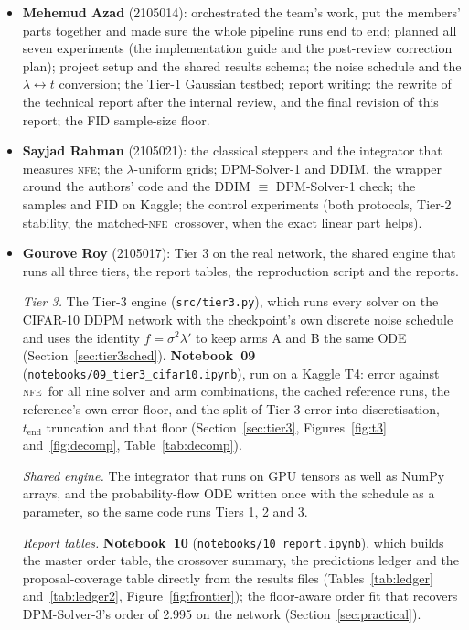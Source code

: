 \documentclass[sigconf]{acmart}
\newcommand{\NFE}{\textsc{nfe}}
\newcommand{\lam}{\lambda}
\newcommand{\tend}{t_{\text{end}}}
\begin{document}
\begin{itemize}
\item \textbf{Mehemud Azad} (2105014): orchestrated the team's work, put the
  members' parts together and made sure the whole pipeline runs end
  to end; planned all seven experiments (the implementation guide and the post-review
  correction plan); project setup and the shared results schema; the noise schedule
  and the $\lam\leftrightarrow t$ conversion; the Tier-1 Gaussian testbed; report
  writing: the rewrite of the technical report after the internal review, and the
  final revision of this report; the FID sample-size floor.
\item \textbf{Sayjad Rahman} (2105021): the classical steppers and the integrator
  that measures \NFE; the $\lam$-uniform grids; DPM-Solver-1 and DDIM, the wrapper
  around the authors' code and the DDIM $\equiv$ DPM-Solver-1 check; the samples and
  FID on Kaggle; the control experiments (both protocols, Tier-2 stability, the
  matched-\NFE\ crossover, when the exact linear part helps).
\item \textbf{Gourove Roy} (2105017): Tier 3 on the real network, the shared
  engine that runs all three tiers, the report tables, the reproduction script and
  the reports.

  \smallskip\noindent \emph{Tier 3.} The Tier-3 engine (\texttt{src/tier3.py}),
  which runs every solver on the CIFAR-10 DDPM network with the checkpoint's own
  discrete noise schedule and uses the identity $f=\sigma^2\lam'$ to keep arms A and
  B the same ODE (Section~\ref{sec:tier3sched}). \textbf{Notebook~09}
  (\texttt{notebooks/}\allowbreak\texttt{09\_tier3\_cifar10.ipynb}), run on a
  Kaggle T4: error against \NFE\ for all nine solver and arm combinations, the cached
  reference runs, the reference's own error floor, and the split of Tier-3 error into
  discretisation, $\tend$ truncation and that floor (Section~\ref{sec:tier3},
  Figures~\ref{fig:t3} and~\ref{fig:decomp}, Table~\ref{tab:decomp}).

  \smallskip\noindent \emph{Shared engine.} The integrator that runs on GPU tensors
  as well as NumPy arrays, and the probability-flow ODE written once with the schedule
  as a parameter, so the same code runs Tiers 1, 2 and 3.

  \smallskip\noindent \emph{Report tables.} \textbf{Notebook~10}
  (\texttt{notebooks/}\allowbreak\texttt{10\_report.ipynb}), which builds the master
  order table, the crossover summary, the predictions ledger and the
  proposal-coverage table directly from the results files
  (Tables~\ref{tab:ledger} and~\ref{tab:ledger2}, Figure~\ref{fig:frontier}); the
  floor-aware order fit that recovers DPM-Solver-3's order of 2.995 on the network
  (Section~\ref{sec:practical}).


\end{itemize}
\end{document}
